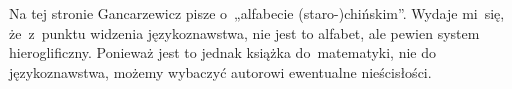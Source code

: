 \documentclass[a4paper,11pt]{article}
\numberwithin{equation}{section}
\begin{document}
\vspace{\spaceFour}





\noindent
{} Na tej stronie Gancarzewicz pisze o~„alfabecie (staro-)chińskim”.
Wydaje mi~się, że~z~punktu widzenia językoznawstwa, nie jest to alfabet,
ale pewien system hieroglificzny. Ponieważ jest to jednak książka
do~matematyki, nie do językoznawstwa, możemy wybaczyć autorowi ewentualne
nieścisłości.

\vspace{\spaceFour}

















\newpage


\vspace{\spaceFive}
\end{document}
